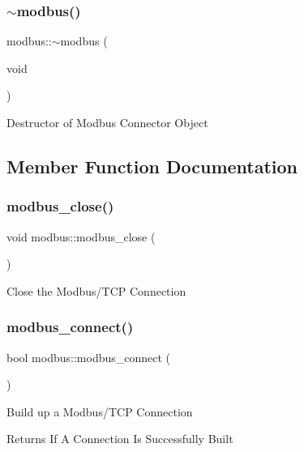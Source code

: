 \subsubsection{\texorpdfstring{$\sim$modbus()}{~modbus()}}
{\footnotesize\ttfamily modbus\+::$\sim$modbus (\begin{DoxyParamCaption}\item[{void}]{ }\end{DoxyParamCaption})}

Destructor of Modbus Connector Object 

\subsection{Member Function Documentation}
\mbox{\label{classmodbus_a9b0db97f942a083431b5374055d4bf1b}} 
\subsubsection{\texorpdfstring{modbus\+\_\+close()}{modbus\_close()}}
{\footnotesize\ttfamily void modbus\+::modbus\+\_\+close (\begin{DoxyParamCaption}{ }\end{DoxyParamCaption})}

Close the Modbus/\+T\+CP Connection \mbox{\label{classmodbus_a13709baee171c97231a33ec4edfa1051}} 
\subsubsection{\texorpdfstring{modbus\+\_\+connect()}{modbus\_connect()}}
{\footnotesize\ttfamily bool modbus\+::modbus\+\_\+connect (\begin{DoxyParamCaption}{ }\end{DoxyParamCaption})}

Build up a Modbus/\+T\+CP Connection \begin{DoxyReturn}{Returns}
If A Connection Is Successfully Built 
\end{DoxyReturn}
\mbox{\label{classmodbus_ae4f8480f4062d7bed3ff463da64d0027}} 
